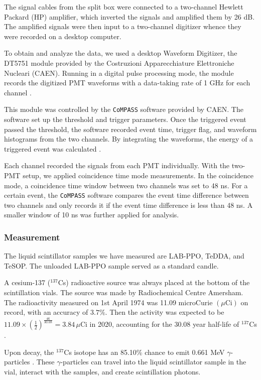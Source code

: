 The signal cables from the split box were connected to a two-channel Hewlett Packard (HP) amplifier, which inverted the signals and amplified them by 26 dB. The amplified signals were then input to a two-channel digitizer whence they were recorded on a desktop computer.

To obtain and analyze the data, we used a desktop Waveform Digitizer, the DT5751 module provided by the Costruzioni Apparecchiature Elettroniche Nucleari (CAEN). Running in a digital pulse processing mode, the module records the digitized PMT waveforms with a data-taking rate of 1 GHz for each channel \cite{caen}.

This module was controlled by the \texttt{CoMPASS} software provided by CAEN. The software set up the threshold and trigger parameters. Once the triggered event passed the threshold, the software recorded event time, trigger flag, and waveform histograms from the two channels. By integrating the waveforms, the energy of a triggered event was calculated \cite{compass}.

Each channel recorded the signals from each PMT individually. With the two-PMT setup, we applied coincidence time mode measurements. In the coincidence mode, a coincidence time window between two channels was set to 48 ns. For a certain event, the \texttt{CoMPASS} software compares the event time difference between two channels and only records it if the event time difference is less than 48 ns. A smaller window of 10 ns was further applied for analysis.

\subsubsection{Measurement}

The liquid scintillator samples we have measured are LAB-PPO, TeDDA, and TeSOP. The unloaded LAB-PPO sample served as a standard candle.

A cesium-137 ($^{137}$Cs) radioactive source was always placed at the bottom of the scintillation vials.
The source was made by Radiochemical Centre Amersham. The radioactivity measured on 1st April 1974 was 11.09 microCurie $(\mu\mathrm{Ci})$ on record, with an accuracy of $3.7\%$. Then the activity was expected to be 
$11.09\times ({\frac{1}{2}})^{\frac{46}{30.08}}=3.84 \, \mu\mathrm{Ci}$ in 2020, accounting for the 30.08 year half-life of $^{137}$Cs \cite{nndc}.

Upon decay, the $^{137}$Cs isotope has an 85.10\% chance to emit 0.661 MeV $\gamma$-particles \cite{nndc}. These $\gamma$-particles can travel into the liquid scintillator sample in the vial, interact with the samples, and create scintillation photons.

